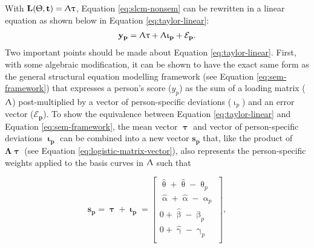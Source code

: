 \documentclass[
12pt, %
twoside,
english]{guelphthesis}
\begin{document}
With \(\mathbf{L(\Uptheta, t)} = \mathbf{\Uplambda\uptau}\), Equation \ref{eq:slcm-nonsem} can be rewritten in a linear equation as shown below in Equation \ref{eq:taylor-linear}:
\begin{align}
 \mathbf{y_p} = \mathbf{\Uplambda\uptau} + \mathbf{\Uplambda\upiota_p} + \mathbf{\mathcal{E}_p}.
 \label{eq:taylor-linear}
 \end{align}
\noindent Two important points should be made about Equation \ref{eq:taylor-linear}. First, with some algebraic modification, it can be shown to have the exact same form as the general structural equation modelling framework (see Equation \ref{eq:sem-framework}) that expresses a person's score (\(y_p\)) as the sum of a loading matrix (\(\mathbf{\Uplambda}\)) post-multiplied by a vector of person-specific deviations (\(\upiota_p\)) and an error vector (\(\mathbf{\mathcal{E}_p}\)). To show the equivalence between Equation \ref{eq:taylor-linear} and Equation \ref{eq:sem-framework}, the mean vector \(\mathbf{\uptau}\) and vector of person-specific deviations \(\mathbf{\upiota_p}\) can be combined into a new vector \(\mathbf{s_p}\) that, like the product of \(\mathbf{\Lambda\uptau}\) (see Equation \ref{eq:logistic-matrix-vector}), also represents the person-specific weights applied to the basis curves in \(\mathbf{\Uplambda}\) such that

\[  
\mathbf{s_p} = \mathbf{\uptau + \upiota_p} =
\begin{bmatrix} 
\hat{\uptheta} + \hat{\uptheta} - \uptheta_p \\ 
\hat{\upalpha} + \hat{\upalpha} - \upalpha_p \\ 
0 + \hat{\upbeta} - \upbeta_p \\ 
0 + \hat{\upgamma} - \upgamma_p \\
\end{bmatrix},
\]
\end{document}
